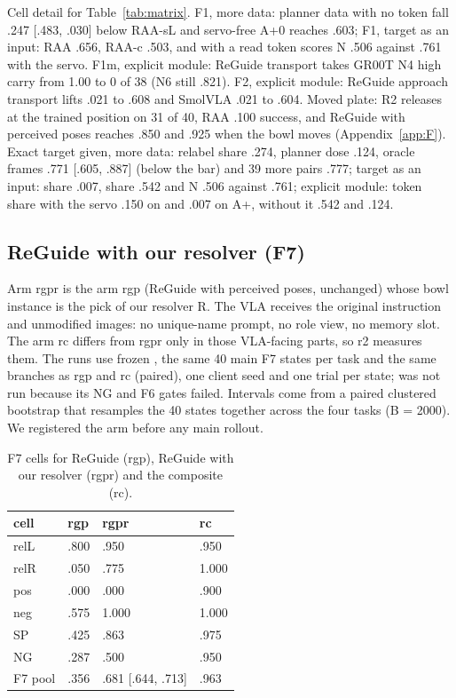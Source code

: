 Cell detail for Table~\ref{tab:matrix}. F1, more data: planner data with no token fall \mi.247 [\mi.483, \mi.030] below RAA-sL and servo-free A+0 reaches .603; F1, target as an input: RAA .656, RAA-c .503, and \pizero{} with a read token scores N .506 against .761 with the servo. F1m, explicit module: ReGuide transport takes GR00T N4 high carry from 1.00 to 0 of 38 (N6 still .821). F2, explicit module: ReGuide approach transport lifts \pizero{} .021 to .608 and SmolVLA .021 to .604. Moved plate: R2 releases at the trained position on 31 of 40, RAA .100 success, and ReGuide with perceived poses reaches .850 and .925 when the bowl moves (Appendix~\ref{app:F}). Exact target given, more data: relabel share .274, planner dose .124, oracle frames .771 [.605, .887] (below the bar) and 39 more pairs .777; target as an input: \pifive{} share \mi.007, \pizero{} share .542 and N .506 against .761; explicit module: token share with the servo \mi.150 on \pizero{} and \mi.007 on \pifive{} A+, without it .542 and .124.

\subsection{ReGuide with our resolver (F7)}
\label{app:L7}

Arm rgpr is the arm rgp (ReGuide with perceived poses, unchanged) whose bowl instance is the pick of our resolver R. The VLA receives the original instruction and unmodified images: no unique-name prompt, no role view, no memory slot. The arm rc differs from rgpr only in those VLA-facing parts, so r2 measures them. The runs use frozen \pifive, the same 40 main F7 states per task and the same branches as rgp and rc (paired), one client seed and one trial per state; \pizero{} was not run because its NG and F6 gates failed. Intervals come from a paired clustered bootstrap that resamples the 40 states together across the four tasks (B = 2000). We registered the arm before any main rollout.

\begin{table}[h]
\caption{F7 cells for ReGuide (rgp), ReGuide with our resolver (rgpr) and the composite (rc).}
\label{tab:L7}
\centering
\footnotesize
\begin{tabular}{@{}llll@{}}
\toprule
cell & rgp & rgpr & rc \\
\midrule
relL & .800 & .950 & .950 \\
relR & .050 & .775 & 1.000 \\
pos & .000 & .000 & .900 \\
neg & .575 & 1.000 & 1.000 \\
SP & .425 & .863 & .975 \\
NG & .287 & .500 & .950 \\
F7 pool & .356 & .681 [.644, .713] & .963 \\
\bottomrule
\end{tabular}
\end{table}

